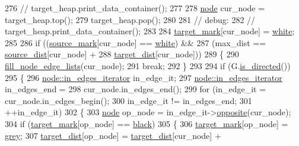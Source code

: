 \begin{DoxyCode}
276         \textcolor{comment}{// target\_heap.print\_data\_container();}
277 
278         \mbox{\hyperlink{classnode}{node}} cur\_node = target\_heap.top();
279         target\_heap.pop();
280 
281         \textcolor{comment}{// debug:}
282         \textcolor{comment}{// target\_heap.print\_data\_container();}
283 
284         \mbox{\hyperlink{classbid__dijkstra_a72bc13758ebe2f752cd15f018c5ba64e}{target\_mark}}[cur\_node] = \mbox{\hyperlink{classbid__dijkstra_a8b7dcccc9fab2ec5edc8da01029c09d5abbd36b03487d4100360b3d6e94309b7b}{white}};
285 
286         \textcolor{keywordflow}{if} ((\mbox{\hyperlink{classbid__dijkstra_a1b3684b69db38c8eaf9d4fbb056bc392}{source\_mark}}[cur\_node] == \mbox{\hyperlink{classbid__dijkstra_a8b7dcccc9fab2ec5edc8da01029c09d5abbd36b03487d4100360b3d6e94309b7b}{white}}) &&
287         (max\_dist == \mbox{\hyperlink{classbid__dijkstra_a19dc6c350617f0fa5769e5c70781d658}{source\_dist}}[cur\_node] +
288             \mbox{\hyperlink{classbid__dijkstra_a7a46fe8fe075d798eaca14b37aa15c0d}{target\_dist}}[cur\_node]))
289         \{
290         \mbox{\hyperlink{classbid__dijkstra_a279264a4cee9a4a8ad45ec957245e90a}{fill\_node\_edge\_lists}}(cur\_node);
291         \textcolor{keywordflow}{break};
292         \}
293 
294         \textcolor{keywordflow}{if} (G.\mbox{\hyperlink{classgraph_afc510be7479fa903fde9e0e615470ab0}{is\_directed}}())
295         \{
296         \mbox{\hyperlink{classnode_a9a96be92add7c1a2771bcd0431ebf8ab}{node::in\_edges\_iterator}} in\_edge\_it;
297         \mbox{\hyperlink{classnode_a9a96be92add7c1a2771bcd0431ebf8ab}{node::in\_edges\_iterator}} in\_edges\_end = 
298             cur\_node.in\_edges\_end();
299         \textcolor{keywordflow}{for} (in\_edge\_it = cur\_node.in\_edges\_begin();
300              in\_edge\_it != in\_edges\_end;
301              ++in\_edge\_it)
302         \{
303             \mbox{\hyperlink{classnode}{node}} op\_node = in\_edge\_it->\mbox{\hyperlink{classnode_a13dbd1809a33a5efede64a359e53a363}{opposite}}(cur\_node);
304             \textcolor{keywordflow}{if} (\mbox{\hyperlink{classbid__dijkstra_a72bc13758ebe2f752cd15f018c5ba64e}{target\_mark}}[op\_node] == \mbox{\hyperlink{classbid__dijkstra_a8b7dcccc9fab2ec5edc8da01029c09d5acc2693da1b850fc6c7e79aef42fae336}{black}})
305             \{
306             \mbox{\hyperlink{classbid__dijkstra_a72bc13758ebe2f752cd15f018c5ba64e}{target\_mark}}[op\_node] = \mbox{\hyperlink{classbid__dijkstra_a8b7dcccc9fab2ec5edc8da01029c09d5a5e3971e0090719b93ed71811edcd7360}{grey}};
307             \mbox{\hyperlink{classbid__dijkstra_a7a46fe8fe075d798eaca14b37aa15c0d}{target\_dist}}[op\_node] = \mbox{\hyperlink{classbid__dijkstra_a7a46fe8fe075d798eaca14b37aa15c0d}{target\_dist}}[cur\_node] +

\end{DoxyCode}
